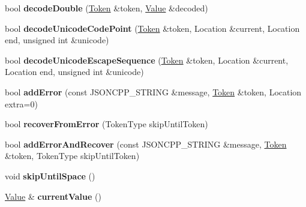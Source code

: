 \begin{DoxyCompactItemize}
\mbox{\label{classJson_1_1OurReader_aa5c15a8cd32754f07430dedba3d1308e}} 
bool {\bfseries decode\+Double} (\hyperlink{classJson_1_1OurReader_1_1Token}{Token} \&token, \hyperlink{classJson_1_1Value}{Value} \&decoded)
\item 
\mbox{\label{classJson_1_1OurReader_ac1bf03c161ece082e48da450c50f528d}} 
bool {\bfseries decode\+Unicode\+Code\+Point} (\hyperlink{classJson_1_1OurReader_1_1Token}{Token} \&token, Location \&current, Location end, unsigned int \&unicode)
\item 
\mbox{\label{classJson_1_1OurReader_adb39be814cc6076b91a0919bdd5b24b0}} 
bool {\bfseries decode\+Unicode\+Escape\+Sequence} (\hyperlink{classJson_1_1OurReader_1_1Token}{Token} \&token, Location \&current, Location end, unsigned int \&unicode)
\item 
\mbox{\label{classJson_1_1OurReader_aa6a920311e6408ff3a45324d49da18a6}} 
bool {\bfseries add\+Error} (const J\+S\+O\+N\+C\+P\+P\+\_\+\+S\+T\+R\+I\+NG \&message, \hyperlink{classJson_1_1OurReader_1_1Token}{Token} \&token, Location extra=0)
\item 
\mbox{\label{classJson_1_1OurReader_a035651f0700a76a815e5f904c63ebb1c}} 
bool {\bfseries recover\+From\+Error} (Token\+Type skip\+Until\+Token)
\item 
\mbox{\label{classJson_1_1OurReader_a074cf3d91e9404fe89e03cfc6a43e6fb}} 
bool {\bfseries add\+Error\+And\+Recover} (const J\+S\+O\+N\+C\+P\+P\+\_\+\+S\+T\+R\+I\+NG \&message, \hyperlink{classJson_1_1OurReader_1_1Token}{Token} \&token, Token\+Type skip\+Until\+Token)
\item 
\mbox{\label{classJson_1_1OurReader_ad48bdaf5b686706f003e792fdbcbf102}} 
void {\bfseries skip\+Until\+Space} ()
\item 
\mbox{\label{classJson_1_1OurReader_a2acd5b1d53e7d7e17c21ff8e96edc09d}} 
\hyperlink{classJson_1_1Value}{Value} \& {\bfseries current\+Value} ()
\item 
\mbox{\label{classJson_1_1OurReader_a298285d035fdbc554caae09d9f0a5859}} 

\end{DoxyCompactItemize}
